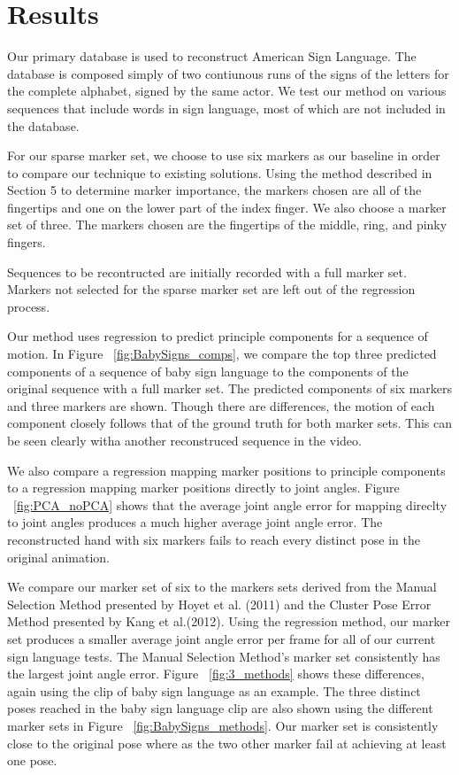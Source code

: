 
\section{Results}
Our primary database is used to reconstruct American Sign Language. 
The database is composed simply of two contiunous
runs of the signs of the letters for the complete 
alphabet, signed by the same actor. We test our method
on various sequences that include words in sign language, most of
which are not included in the database.

For our sparse marker set, we choose to use six markers as our
baseline in order to compare our technique to existing solutions. 
Using the method described in Section 5 to determine 
marker importance, the markers chosen are all of the fingertips
and one on the lower part of the index finger. We also choose a
marker set of three. The markers chosen are the fingertips of the 
middle, ring, and pinky fingers.

Sequences to be recontructed are initially recorded with a full
marker set. Markers not selected for the sparse marker set
are left out of the regression process.

Our method uses regression to predict principle components for
a sequence of motion. In Figure ~\ref{fig:BabySigns_comps}, we compare
the top three predicted components of a sequence of baby sign language
to the components of the original sequence with a full marker set. The
predicted components of six markers and three markers are shown.
Though there are differences, the motion of each component closely
follows that of the ground truth for both marker sets. This can be seen clearly
witha another reconstruced sequence in the video.

We also compare a regression mapping marker positions to principle components to
a regression mapping marker positions directly to joint angles. Figure
~\ref{fig:PCA_noPCA} shows that the average joint angle error for mapping
direclty to joint angles produces a much higher average joint angle error.
The reconstructed hand with six markers fails to reach every distinct pose
in the original animation.

We compare our marker set of six to the markers sets derived from the Manual
Selection Method presented by Hoyet et al. (2011) and the Cluster Pose Error
Method presented by Kang et al.(2012). Using the regression
method, our marker set produces a smaller average joint angle error per frame 
for all of our current sign language tests. The Manual Selection Method's
marker set consistently has the largest joint angle error. Figure
~\ref{fig:3_methods} shows these differences, again using the clip
of baby sign language as an example. The three distinct poses reached
in the baby sign language clip are also shown using the different marker
sets in Figure ~\ref{fig:BabySigns_methods}. Our marker set is consistently
close to the original pose where as
the two other marker fail at achieving at least one pose.\\

